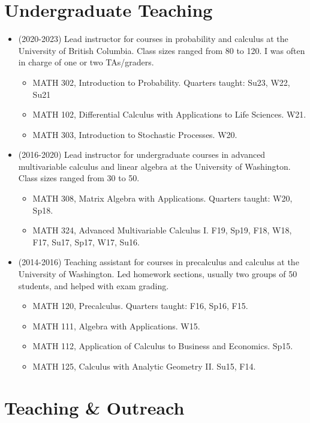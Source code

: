 \documentclass[letterpaper]{article}
\begin{document}
\section*{Undergraduate Teaching} 
\begin{itemize} \item (2020-2023) Lead instructor for courses in probability and calculus at the University of British Columbia. Class sizes ranged from 80 to 120. I was often in charge of one or two TAs/graders.  

\begin{itemize} \item MATH 302, Introduction to Probability. Quarters taught: Su23, W22, Su21
\item MATH 102, Differential Calculus with Applications to Life Sciences. W21. 
\item MATH 303, Introduction to Stochastic Processes. W20. 
\end{itemize} 

\item (2016-2020) Lead instructor for undergraduate courses in advanced multivariable calculus and linear algebra at the University of Washington. Class sizes ranged from 30 to 50. 
\begin{itemize} \item MATH 308, Matrix Algebra with Applications. Quarters taught: W20, Sp18.
\item MATH 324, Advanced Multivariable Calculus I. F19, Sp19, F18, W18, F17, Su17, Sp17, W17, Su16. 
\end{itemize} 

\item (2014-2016) Teaching assistant for courses in precalculus and calculus at the University of Washington. Led homework sections, usually two groups of 50 students, and helped with exam grading. 
\begin{itemize} \item MATH 120, Precalculus. Quarters taught: F16, Sp16, F15. 
\item MATH 111, Algebra with Applications. W15. 
\item MATH 112, Application of Calculus to Business and Economics. Sp15. 
\item MATH 125, Calculus with Analytic Geometry II. Su15, F14. 
\end{itemize} 
\end{itemize}

\section*{Teaching \& Outreach}
\end{document}
